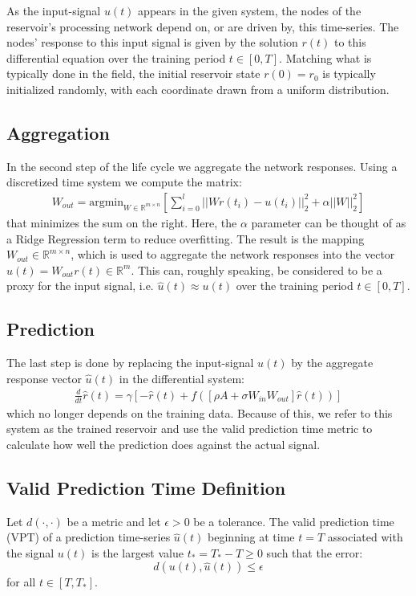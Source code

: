 \documentclass[12pt,oneside]{article}
\theoremstyle{plain}
\begin{document}
As the input-signal $u(t)$ appears in the given system, the nodes of the reservoir's processing network depend on, or are driven by, this time-series.  The nodes' response
to this input signal is given by the solution $r(t)$ to this differential equation over the training period $t \in [0,T]$.  Matching what is typically done in the field,
the initial reservoir state $r(0) = r_0$ is typically initialized randomly, with each coordinate drawn from a uniform distribution.

\subsection{Aggregation}
In the second step of the life cycle we aggregate the network responses.  Using a discretized time system we compute the matrix:
\begin{align*}
    W_{out} = \text{argmin}_{W \in \mathbb{R}^{m \times n}} \left [ \sum_{i=0}^l ||Wr(t_i) - u(t_i)||_2^2 + \alpha ||W||_2^2 \right ]
\end{align*}
that minimizes the sum on the right.  Here, the $\alpha$ parameter can be thought of as a Ridge Regression term to reduce overfitting.
The result is the mapping $W_{out} \in \mathbb{R}^{m \times n}$, which is used to aggregate the network responses into the vector $\hat{u}(t) = W_{out}r(t) \in \mathbb{R}^m$.
This can, roughly speaking, be considered to be a proxy for the input signal, i.e. $\hat{u}(t) \approx u(t)$ over the training period $t \in [0,T]$.

\subsection{Prediction}
The last step is done by replacing the input-signal $u(t)$ by the aggregate response vector $\hat{u}(t)$ in the differential system:
\begin{align*}
    \frac{d}{dt}\hat{r}(t) = \gamma[-\hat{r}(t) + f([\rho A + \sigma W_{in}W_{out}]\hat{r}(t))]
\end{align*}
which no longer depends on the training data.  Because of this, we refer to this system as the trained reservoir and use the valid prediction time metric to calculate how well 
the prediction does against the actual signal.

\subsection{Valid Prediction Time Definition}
Let $d(\cdot, \cdot)$ be a metric and let $\epsilon > 0$ be a tolerance.  The valid prediction time (VPT) of a prediction time-series $\hat{u}(t)$ beginning at time $t = T$
associated with the signal $u(t)$ is the largest value $t_* = T_* - T \geq 0$ such that the error:
\[d(u(t),\hat{u}(t)) \leq \epsilon\]
for all $t \in [T,T_*]$.
\end{document}
